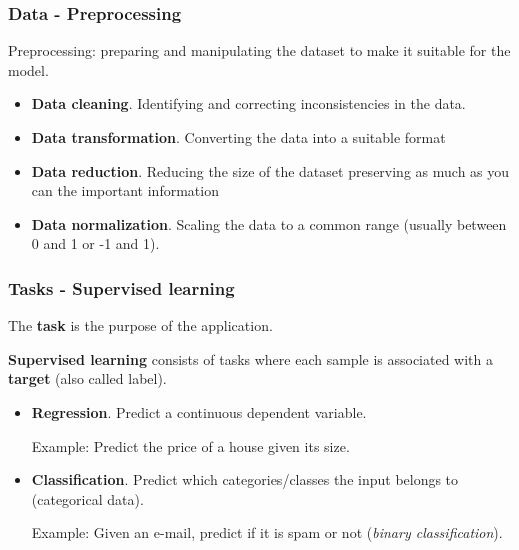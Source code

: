 \documentclass{beamer}
\begin{document}
	\begin{frame}
		\frametitle{Data - Preprocessing}
		Preprocessing: preparing and manipulating the dataset to make it suitable for the model.
		\begin{itemize}
			\item \textbf{Data cleaning}. Identifying and correcting inconsistencies in the data.
			\item \textbf{Data transformation}. Converting the data into a suitable format
			\item \textbf{Data reduction}. Reducing the size of the dataset preserving as much as you can the important information
			\item \textbf{Data normalization}. Scaling the data to a common range (usually between 0 and 1 or -1 and 1).
		\end{itemize}
	\end{frame}
	

	\begin{frame}
		\frametitle{Tasks - Supervised learning}
		The \textbf{task} is the purpose of the application.
		
		\vspace{5mm}
		
		\textbf{Supervised learning} consists of tasks where each sample is associated with a \textbf{target} (also called label).
		
		
	   	\begin{itemize}
			\item \textbf{Regression}. Predict a continuous dependent variable.
			
			Example: Predict the price of a house given its size.
			\item \textbf{Classification}.  Predict which categories/classes the input belongs to (categorical data).
			
			Example: Given an e-mail, predict if it is spam or not (\textsl{binary classification}).
		\end{itemize}
	\end{frame}

\end{document}
